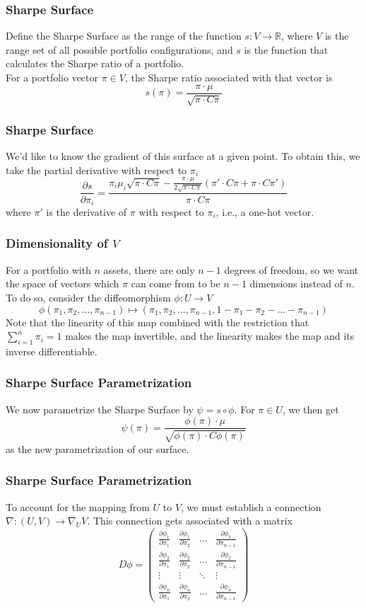 \documentclass{beamer}
\begin{document}
\begin{frame}
\frametitle{Sharpe Surface}
Define the Sharpe Surface as the range of the function $s: V \rightarrow \mathbb{R}$, where $V$ is the range set of all possible portfolio configurations, and $s$ is the function that calculates the Sharpe ratio of a portfolio.
\vspace{.1in}
\\For a portfolio vector $\pi\in V$, the Sharpe ratio associated with that vector is
\[s(\pi) = \frac{\pi \cdot \mu}{\sqrt{\pi \cdot C \pi}}\]
\end{frame}

\begin{frame}
\frametitle{Sharpe Surface}
We'd like to know the gradient of this surface at a given point.  To obtain this, we take the partial derivative with respect to $\pi_i$ 
\[\frac{\partial s}{\partial \pi_i} = \frac{\pi_i \mu_i \sqrt{\pi \cdot C \pi} - \frac{ \pi \cdot \mu}{2\sqrt{\pi \cdot C \pi}}(\pi'\cdot C\pi + \pi \cdot C\pi') }{\pi \cdot C \pi}\]
where $\pi'$ is the derivative of $\pi$ with respect to $\pi_i$, i.e., a one-hot vector.
\end{frame}

\begin{frame}
\frametitle{Dimensionality of $V$}
For a portfolio with $n$ assets, there are only $n-1$ degrees of freedom, so we want the space of vectors which $\pi$ can come from to be $n-1$ dimensions instead of $n$.  To do so, consider the diffeomorphism $\phi : U \rightarrow V$
\[\phi(\pi_1, \pi_2, \dots, \pi_{n-1}) \mapsto (\pi_1, \pi_2, \dots, \pi_{n-1}, 1 - \pi_1 - \pi_2 - \dots - \pi_{n-1})\]
Note that the linearity of this map combined with the restriction that $\sum_{i=1}^n \pi_i = 1$ makes the map invertible, and the linearity makes the map and its inverse differentiable.
\end{frame}


\begin{frame}
\frametitle{Sharpe Surface Parametrization}
We now parametrize the Sharpe Surface by $\psi = s \circ \phi$.  For $\pi \in U$, we then get
\[\psi(\pi) = \frac{\phi(\pi) \cdot \mu}{\sqrt{\phi(\pi) \cdot C \phi(\pi)}} \]
as the new parametrization of our surface.
\end{frame}


\begin{frame}
\frametitle{Sharpe Surface Parametrization}
To account for the mapping from $U$ to $V$, we must establish a connection $\nabla :(U,V)\rightarrow \nabla_U V$.  This connection gets associated with a matrix
\[D\phi = \begin{pmatrix}
\frac{\partial \phi_1}{\partial \pi_1} & \frac{\partial \phi_1}{\partial \pi_2} & \dots & \frac{\partial \phi_1}{\partial \pi_{n-1}} \\
\frac{\partial \phi_2}{\partial \pi_1} & \frac{\partial \phi_2}{\partial \pi_2} & \dots & \frac{\partial \phi_2}{\partial \pi_{n-1}} \\
\vdots  & \vdots & \ddots & \vdots \\
\frac{\partial \phi_n}{\partial \pi_1} & \frac{\partial \phi_n}{\partial \pi_2} & \dots & \frac{\partial \phi_n}{\partial \pi_{n-1}} 
\end{pmatrix}\]
\end{frame}
\end{document}
